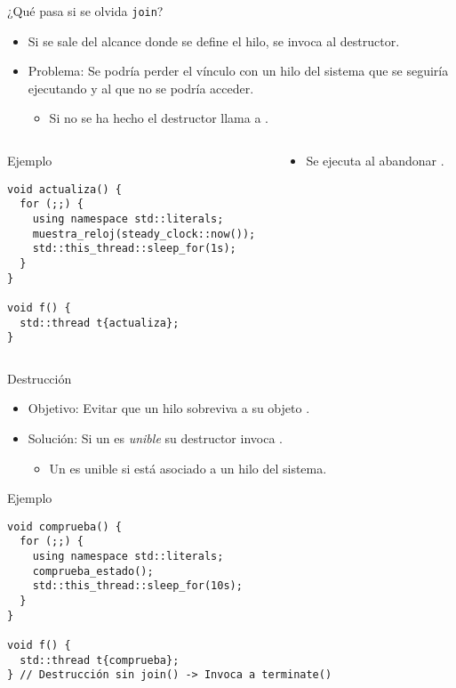 \begin{frame}[fragile]{¿Qué pasa si se olvida \texttt{join}?}
\begin{itemize}
  \item Si se sale del alcance donde se define el hilo, se invoca al destructor.
  \item \alert{Problema}: Se podría perder el vínculo con un hilo del sistema que se seguiría
        ejecutando y al que no se podría acceder.
    \begin{itemize}
      \item Si no se ha hecho  el destructor llama a .
    \end{itemize}
\end{itemize}

\begin{columns}

\begin{column}{.5\textwidth}
\begin{block}{Ejemplo}
\begin{lstlisting}[basicstyle=\tiny]
void actualiza() {
  for (;;) {
    using namespace std::literals;
    muestra_reloj(steady_clock::now());
    std::this_thread::sleep_for(1s);
  }
}

void f() {
  std::thread t{actualiza};
}
\end{lstlisting}
\end{block}
\end{column}

\begin{column}{.5\textwidth}
\begin{itemize}
  \item Se ejecuta  al abandonar .
\end{itemize}
\end{column}
\end{columns}
\end{frame}

\begin{frame}[fragile]{Destrucción}
\begin{itemize}
  \item Objetivo: Evitar que un hilo sobreviva a su objeto .
  \item Solución: Si un  es \emph{unible} su destructor invoca .
    \begin{itemize}
      \item Un  es unible si está asociado a un hilo del sistema.
    \end{itemize}
\end{itemize}
\begin{block}{Ejemplo}
\begin{lstlisting}[basicstyle=\tiny]
void comprueba() {
  for (;;) {
    using namespace std::literals;
    comprueba_estado();
    std::this_thread::sleep_for(10s);
  }
}

void f() {
  std::thread t{comprueba};
} // Destrucción sin join() -> Invoca a terminate()
\end{lstlisting}
\end{block}
\end{frame}

